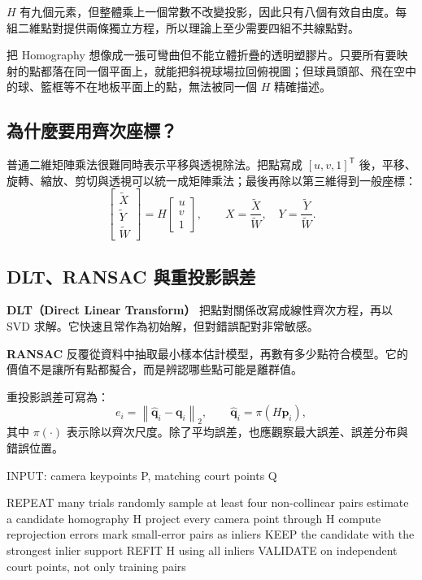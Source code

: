 \documentclass[11pt,a4paper,oneside]{report}
\begin{document}
$H$ 有九個元素，但整體乘上一個常數不改變投影，因此只有八個有效自由度。每組二維點對提供兩條獨立方程，所以理論上至少需要四組不共線點對。

\begin{conceptBox}
把 Homography 想像成一張可彎曲但不能立體折疊的透明塑膠片。只要所有要映射的點都落在同一個平面上，就能把斜視球場拉回俯視圖；但球員頭部、飛在空中的球、籃框等不在地板平面上的點，無法被同一個 $H$ 精確描述。
\end{conceptBox}

\subsection{為什麼要用齊次座標？}

普通二維矩陣乘法很難同時表示平移與透視除法。把點寫成 $[u,v,1]^\mathsf{T}$ 後，平移、旋轉、縮放、剪切與透視可以統一成矩陣乘法；最後再除以第三維得到一般座標：
\[
\begin{bmatrix}\tilde X\\\tilde Y\\\tilde W\end{bmatrix}
=H\begin{bmatrix}u\\v\\1\end{bmatrix},
\qquad
X=\frac{\tilde X}{\tilde W},\quad
Y=\frac{\tilde Y}{\tilde W}.
\]

\subsection{DLT、RANSAC 與重投影誤差}

\begin{historyBox}
\textbf{DLT（Direct Linear Transform）}\quad
把點對關係改寫成線性齊次方程，再以 SVD 求解。它快速且常作為初始解，但對錯誤配對非常敏感。

\textbf{RANSAC}\quad
反覆從資料中抽取最小樣本估計模型，再數有多少點符合模型。它的價值不是讓所有點都擬合，而是辨認哪些點可能是離群值。
\end{historyBox}

重投影誤差可寫為：
\[
e_i=\left\|\widehat{\mathbf q}_i-\mathbf q_i\right\|_2,
\qquad
\widehat{\mathbf q}_i=\pi(H\mathbf p_i),
\]
其中 $\pi(\cdot)$ 表示除以齊次尺度。除了平均誤差，也應觀察最大誤差、誤差分布與錯誤位置。

\begin{pseudoBox}
INPUT: camera keypoints P, matching court points Q

REPEAT many trials
  randomly sample at least four non-collinear pairs
  estimate a candidate homography H
  project every camera point through H
  compute reprojection errors
  mark small-error pairs as inliers
KEEP the candidate with the strongest inlier support
REFIT H using all inliers
VALIDATE on independent court points, not only training pairs
\end{pseudoBox}
\end{document}

